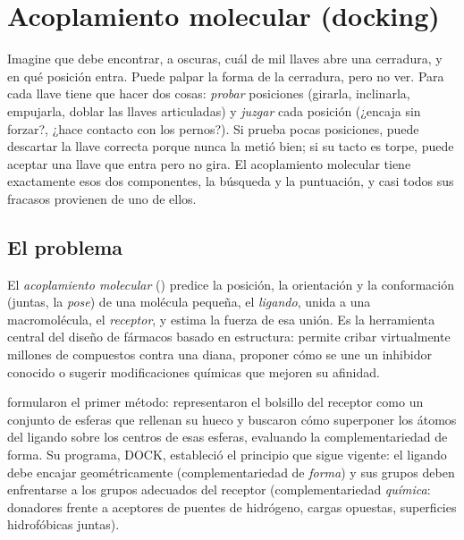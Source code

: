 \section{Acoplamiento molecular (docking)}\label{sec:15-docking}

\begin{intuicion}
Imagine que debe encontrar, a oscuras, cuál de mil llaves abre una cerradura, y en qué posición entra. Puede palpar la forma de la cerradura, pero no ver. Para cada llave tiene que hacer dos cosas: \emph{probar} posiciones (girarla, inclinarla, empujarla, doblar las llaves articuladas) y \emph{juzgar} cada posición (¿encaja sin forzar?, ¿hace contacto con los pernos?). Si prueba pocas posiciones, puede descartar la llave correcta porque nunca la metió bien; si su tacto es torpe, puede aceptar una llave que entra pero no gira. El acoplamiento molecular tiene exactamente esos dos componentes, la búsqueda y la puntuación, y casi todos sus fracasos provienen de uno de ellos.
\end{intuicion}

\subsection{El problema}

El \emph{acoplamiento molecular} () predice la posición, la orientación y la conformación (juntas, la \emph{pose}) de una molécula pequeña, el \emph{ligando}, unida a una macromolécula, el \emph{receptor}, y estima la fuerza de esa unión. Es la herramienta central del diseño de fármacos basado en estructura: permite cribar virtualmente millones de compuestos contra una diana, proponer cómo se une un inhibidor conocido o sugerir modificaciones químicas que mejoren su afinidad.

\textcite{c15-kuntz1982} formularon el primer método: representaron el bolsillo del receptor como un conjunto de esferas que rellenan su hueco y buscaron cómo superponer los átomos del ligando sobre los centros de esas esferas, evaluando la complementariedad de forma. Su programa, DOCK, estableció el principio que sigue vigente: el ligando debe encajar geométricamente (complementariedad de \emph{forma}) y sus grupos deben enfrentarse a los grupos adecuados del receptor (complementariedad \emph{química}: donadores frente a aceptores de puentes de hidrógeno, cargas opuestas, superficies hidrofóbicas juntas).

